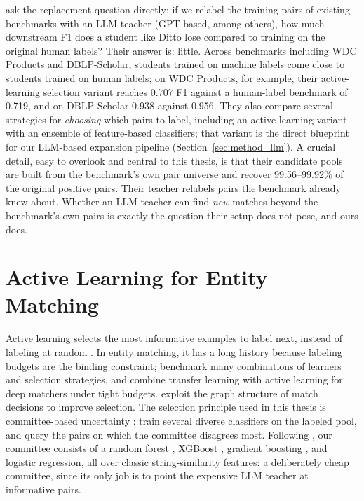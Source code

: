 \documentclass[a4paper,oneside,bibliography=totoc]{scrbook}
\begin{document}
\citet{steiner2026labeling} ask the replacement question directly: if we relabel the training pairs of existing benchmarks with an LLM teacher (GPT-based, among others), how much downstream F1 does a student like Ditto lose compared to training on the original human labels? Their answer is: little. Across benchmarks including WDC Products and DBLP-Scholar, students trained on machine labels come close to students trained on human labels; on WDC Products, for example, their active-learning selection variant reaches 0.707 F1 against a human-label benchmark of 0.719, and on DBLP-Scholar 0.938 against 0.956. They also compare several strategies for \emph{choosing} which pairs to label, including an active-learning variant with an ensemble of feature-based classifiers; that variant is the direct blueprint for our LLM-based expansion pipeline (Section~\ref{sec:method_llm}). A crucial detail, easy to overlook and central to this thesis, is that their candidate pools are built from the benchmark's own pair universe and recover 99.56--99.92\% of the original positive pairs. Their teacher relabels pairs the benchmark already knew about. Whether an LLM teacher can find \emph{new} matches beyond the benchmark's own pairs is exactly the question their setup does not pose, and ours does.

\section{Active Learning for Entity Matching}
\label{sec:rw_al}

Active learning selects the most informative examples to label next, instead of labeling at random \cite{settles2009active}. In entity matching, it has a long history because labeling budgets are the binding constraint; \citet{meduri2020comprehensive} benchmark many combinations of learners and selection strategies, and \citet{kasai2019low} combine transfer learning with active learning for deep matchers under tight budgets. \citet{primpeli2021graph} exploit the graph structure of match decisions to improve selection. The selection principle used in this thesis is committee-based uncertainty \cite{settles2009active}: train several diverse classifiers on the labeled pool, and query the pairs on which the committee disagrees most. Following \citet{steiner2026labeling}, our committee consists of a random forest \cite{breiman2001random}, XGBoost \cite{chen2016xgboost}, gradient boosting \cite{friedman2001greedy}, and logistic regression, all over classic string-similarity features: a deliberately cheap committee, since its only job is to point the expensive LLM teacher at informative pairs.
\end{document}
